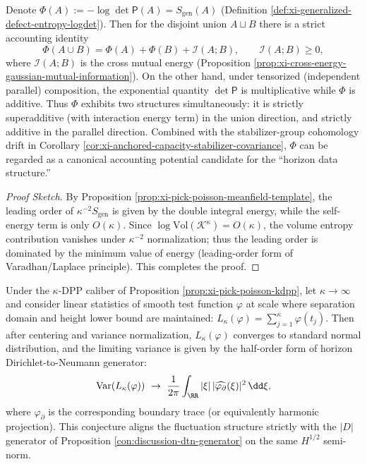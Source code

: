 \begin{remark}\label{rem:xi-anchored-capacity-accounting-structures}
Denote \(\Phi(A):=-\log\det\mathsf P(A)=S_{\mathrm{gen}}(A)\) (Definition \ref{def:xi-generalized-defect-entropy-logdet}).
Then for the disjoint union \(A\sqcup B\) there is a strict accounting identity
\[
\Phi(A\cup B)=\Phi(A)+\Phi(B)+\mathcal I(A;B),\qquad \mathcal I(A;B)\ge 0,
\]
where \(\mathcal I(A;B)\) is the cross mutual energy (Proposition \ref{prop:xi-cross-energy-gaussian-mutual-information}).
On the other hand, under tensorized (independent parallel) composition, the exponential quantity \(\det\mathsf P\) is multiplicative while \(\Phi\) is additive.
Thus \(\Phi\) exhibits two structures simultaneously: it is strictly superadditive (with interaction energy term) in the union direction, and strictly additive in the parallel direction.
Combined with the stabilizer-group cohomology drift in Corollary \ref{cor:xi-anchored-capacity-stabilizer-covariance}, \(\Phi\) can be regarded as a canonical accounting potential candidate for the ``horizon data structure.''
\end{remark}
\begin{proof}[Proof Sketch]
By Proposition \ref{prop:xi-pick-poisson-meanfield-template}, the leading order of \(\kappa^{-2}S_{\mathrm{gen}}\) is given by the double integral energy, while the self-energy term is only \(O(\kappa)\).
Since \(\log\mathrm{Vol}(\mathcal K^\kappa)=O(\kappa)\), the volume entropy contribution vanishes under \(\kappa^{-2}\) normalization;
thus the leading order is dominated by the minimum value of energy (leading-order form of Varadhan/Laplace principle). This completes the proof.
\end{proof}

\begin{conjecture}\label{conj:xi-kdpp-linear-statistics-clt}
Under the \(\kappa\)-DPP caliber of Proposition \ref{prop:xi-pick-poisson-kdpp}, let \(\kappa\to\infty\) and consider linear statistics of smooth test function \(\varphi\) at scale where separation domain and height lower bound are maintained:
\(
L_\kappa(\varphi)=\sum_{j=1}^{\kappa}\varphi(t_j)
\).
Then after centering and variance normalization, \(L_\kappa(\varphi)\) converges to standard normal distribution, and the limiting variance is given by the half-order form of horizon Dirichlet-to-Neumann generator:
\[
\mathrm{Var}(L_\kappa(\varphi))
\ \to\
\frac{1}{2\pi}\int_{\RR}|\xi|\,|\widehat{\varphi_{\partial}}(\xi)|^2\,\dd\xi,
\]
where \(\varphi_{\partial}\) is the corresponding boundary trace (or equivalently harmonic projection).
This conjecture aligns the fluctuation structure strictly with the \(|D|\) generator of Proposition \ref{con:discussion-dtn-generator} on the same \(H^{1/2}\) semi-norm.
\end{conjecture}

